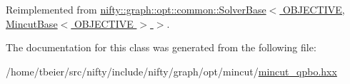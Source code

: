 Reimplemented from \hyperlink{classnifty_1_1graph_1_1opt_1_1common_1_1SolverBase_a6a5d77ee514c4b5f44d1908c1000f0ff}{nifty\+::graph\+::opt\+::common\+::\+Solver\+Base$<$ O\+B\+J\+E\+C\+T\+I\+V\+E, Mincut\+Base$<$ O\+B\+J\+E\+C\+T\+I\+V\+E $>$ $>$}.



The documentation for this class was generated from the following file\+:\begin{DoxyCompactItemize}
\item 
/home/tbeier/src/nifty/include/nifty/graph/opt/mincut/\hyperlink{mincut__qpbo_8hxx}{mincut\+\_\+qpbo.\+hxx}\end{DoxyCompactItemize}
